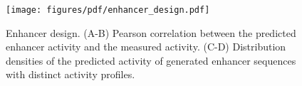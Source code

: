 \begin{figure}[!htb]
    \centering
    \texttt{[image: figures/pdf/enhancer\_design.pdf]}
    \caption{Enhancer design. (A-B) Pearson correlation between the predicted enhancer activity and the measured activity. (C-D) Distribution densities of the predicted activity of generated enhancer sequences with distinct activity profiles.}
    \label{fig:enhancer_design}
\end{figure}